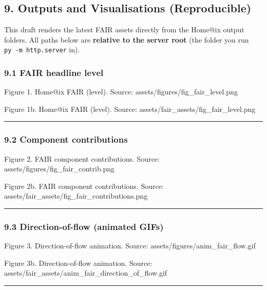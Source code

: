 \subsection{9. Outputs and Visualisations
(Reproducible)}\label{outputs-and-visualisations-reproducible}

This draft renders the latest FAIR assets directly from the Home@ix
output folders. All paths below are \textbf{relative to the server root}
(the folder you run \texttt{py\ -m\ http.server} in).

\subsubsection{9.1 FAIR headline level}\label{fair-headline-level}

Figure 1. Home@ix FAIR (level). Source:
assets/figures/fig\_fair\_level.png

Figure 1b. Home@ix FAIR (level). Source:
assets/fair\_assets/fig\_fair\_level.png

\begin{center}\rule{0.5\linewidth}{0.5pt}\end{center}

\subsubsection{9.2 Component
contributions}\label{component-contributions}

Figure 2. FAIR component contributions. Source:
assets/figures/fig\_fair\_contrib.png

Figure 2b. FAIR component contributions. Source:
assets/fair\_assets/fig\_fair\_contributions.png

\begin{center}\rule{0.5\linewidth}{0.5pt}\end{center}

\subsubsection{9.3 Direction-of-flow (animated
GIFs)}\label{direction-of-flow-animated-gifs}

Figure 3. Direction-of-flow animation. Source:
assets/figures/anim\_fair\_flow.gif

Figure 3b. Direction-of-flow animation. Source:
assets/fair\_assets/anim\_fair\_direction\_of\_flow.gif

\begin{center}\rule{0.5\linewidth}{0.5pt}\end{center}

